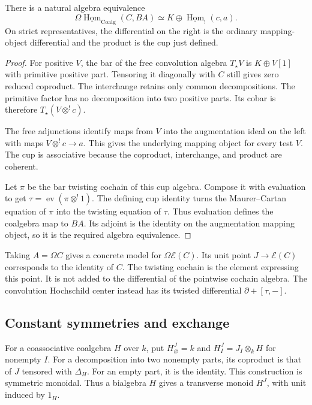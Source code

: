 \begin{proposition}\label{v4-arith:centers:prop:untwisted}
There is a natural
algebra equivalence
\[
 \Omega
 \underline{\operatorname{Hom}}_{\operatorname{Coalg}}(C,BA)
 \simeq
 K\oplus\underline{\operatorname{Hom}}_!(c,a).
\]
On strict representatives,
the differential on
the right is the
ordinary mapping-object
differential and
the product is
the cup just
defined.
\end{proposition}

\begin{proof}
For positive $V$,
the bar of the
free convolution
algebra $T_\star V$
is $K\oplus V[1]$
with primitive
positive part.
Tensoring it diagonally with $C$ still gives zero reduced
coproduct. The interchange retains only common decompositions.
The primitive factor has no decomposition into two positive parts.
Its cobar is
therefore
$T_\star(V\otimes^!c)$.

The free adjunctions
identify maps from
$V$ into the
augmentation ideal
on the left with
maps
$V\otimes^!c\to a$.
This gives the
underlying mapping
object for every
test $V$.
The cup is
associative because
the coproduct,
interchange, and
product are
coherent.

Let $\pi$ be
the bar twisting
cochain of this
cup algebra.
Compose it with
evaluation to get
$\tau=\operatorname{ev}(\pi\otimes^!1)$.
The defining cup
identity turns
the Maurer--Cartan
equation of $\pi$
into the twisting
equation of
$\tau$.
Thus evaluation
defines the
coalgebra map
to $BA$.
Its adjoint
is the identity
on the augmentation
mapping object,
so it is the
required algebra
equivalence.
\end{proof}

Taking $A=\Omega C$
gives a concrete
model for
$\Omega\mathcal E(C)$.
Its unit point
$J\to\mathcal E(C)$
corresponds to
the identity
of $C$.
The twisting
cochain is the
element expressing
this point.
It is not added
to the differential
of the pointwise
cochain algebra.
The convolution
Hochschild center
instead has its
twisted differential
$\partial+[\tau,-]$.

\subsection{Constant symmetries and exchange}
\label{v4-arith:centers:subsec:constant-symmetries}

For a coassociative
coalgebra $H$ over
$k$, put
$H^J_\varnothing=k$
and
$H^J_I=J_I\otimes_kH$
for nonempty $I$.
For a decomposition
into two nonempty
parts, its coproduct
is that of $J$
tensored with
$\Delta_H$.
For an empty part,
it is the identity.
This construction
is symmetric
monoidal.
Thus a bialgebra
$H$ gives a
transverse monoid
$H^J$, with
unit induced
by $1_H$.


